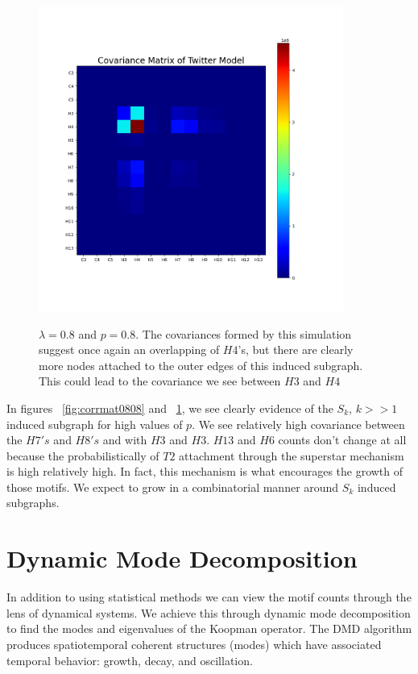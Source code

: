 \begin{figure}
    \includegraphics[width=10cm]{Images/CovMatTwitterModel080809.png}\
    \centering
    \caption{$\lambda=0.8$ and $p=0.8$. The covariances formed by this simulation suggest once again
    an overlapping of $H4$'s, but there are clearly more nodes attached to the outer edges of this
    induced subgraph. This could lead to the covariance we see between $H3$ and $H4$}
    \label{fig:covmat0808}
\end{figure}

\FloatBarrier

In figures ~\ref{fig:corrmat0808} and ~\ref{fig:covmat0808}, we see clearly evidence of the $S_k$, $k>>1$ induced subgraph
for high values of $p$. We see relatively high covariance between the $H7's$ and
$H8's$ and with $H3$ and $H3$. $H13$ and $H6$ counts don't change at all because the probabilistically
of $T2$ attachment through the superstar mechanism is high relatively high. In fact, this 
mechanism is what encourages the growth of those motifs. We expect to grow in a combinatorial manner
 around $S_k$ induced subgraphs.

\chapter{Dynamic Mode Decomposition}
In addition to using statistical methods we can view the motif counts through the lens of dynamical systems. We achieve this through
dynamic mode decomposition to find the modes and eigenvalues of the Koopman operator.
 The DMD algorithm produces spatiotemporal coherent structures (modes)
which have associated temporal behavior: growth, decay, and oscillation. 

